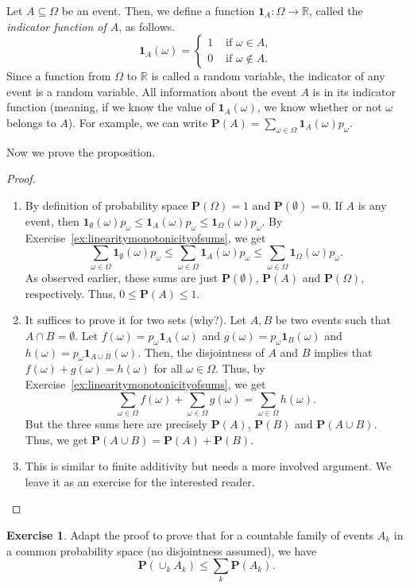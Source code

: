 \documentclass[preprint,  11pt]{amsart}
\newcommand{\para}[1]{\vspace{4mm}\noindent{\bfseries #1:}}
\theoremstyle{plain} %
\theoremstyle{definition} %
\newtheorem{exercise}[theorem]{Exercise}
\begin{document}
\para{Notation} Let $A\subseteq \Omega$ be an event. Then, we define a function ${\mathbf 1}_{A}:\Omega\rightarrow \mathbb{R}$, called the {\em indicator function of $A$},  as follows.
$$
{\mathbf 1}_{A}(\omega) = \begin{cases}
1 & \mbox{ if }\omega\in A,\\
0 & \mbox{ if }\omega\not\in A.
\end{cases}
$$ 
Since a function from $\Omega$ to $\mathbb{R}$ is called a random variable, the indicator of any event is a random variable. All information about the event $A$ is in its indicator function (meaning, if we know the value of ${\mathbf 1}_{A}(\omega)$, we know whether or not $\omega$ belongs to $A$). For example, we can write $\mathbf{P}(A)=\sum_{\omega\in \Omega}{\mathbf 1}_{A}(\omega)p_{\omega}$.

Now we prove the proposition.
\begin{proof} 
\begin{enumerate}\setlength\itemsep{6pt}
\item By definition of probability space $\mathbf{P}(\Omega)=1$ and $\mathbf{P}(\emptyset)=0$. If $A$ is any event, then ${\mathbf 1}_{\emptyset}(\omega)p_{\omega}\le {\mathbf 1}_{A}(\omega)p_{\omega}\le {\mathbf 1}_{\Omega}(\omega)p_{\omega}$. By Exercise~\ref{ex:linearitymonotonicityofsums}, we get
$$
\sum_{\omega\in \Omega}{\mathbf 1}_{\emptyset}(\omega)p_{\omega} \le \sum_{\omega\in \Omega}{\mathbf 1}_{A}(\omega)p_{\omega} \le \sum_{\omega\in \Omega}{\mathbf 1}_{\Omega}(\omega)p_{\omega}.
$$
As observed earlier, these sums are just $\mathbf{P}(\emptyset)$, $\mathbf{P}(A)$ and $\mathbf{P}(\Omega)$, respectively. Thus, $0\le \mathbf{P}(A)\le 1$.
\item It suffices to prove it for two sets (why?). Let $A,B$ be two events such that $A\cap B=\emptyset$. Let $f(\omega)=p_{\omega}{\mathbf 1}_{A}(\omega)$ and $g(\omega)=p_{\omega}{\mathbf 1}_{B}(\omega)$ and $h(\omega)=p_{\omega}{\mathbf 1}_{A\cup B}(\omega)$. Then, the disjointness of $A$ and $B$ implies that $f(\omega)+g(\omega)=h(\omega)$ for all $\omega\in \Omega$. Thus, by Exercise~\ref{ex:linearitymonotonicityofsums}, we get 
$$
\sum_{\omega\in \Omega}f(\omega)+\sum_{\omega\in \Omega}g(\omega) = \sum_{\omega\in \Omega}h(\omega).
$$
But the three sums here are precisely $\mathbf{P}(A)$, $\mathbf{P}(B)$ and $\mathbf{P}(A\cup B)$. Thus, we get $\mathbf{P}(A\cup B)=\mathbf{P}(A)+\mathbf{P}(B)$.
\item This is similar to finite additivity but needs a more involved argument. We leave it as an exercise for the interested reader. \qedhere
\end{enumerate}
\end{proof}
\begin{exercise} Adapt the proof to prove that for a countable family of events $A_{k}$ in a common probability space (no disjointness assumed), we have
$$
\mathbf{P}(\cup_{k}A_{k})\le \sum_{k}\mathbf{P}(A_{k}).
$$
\end{exercise}
\end{document}
